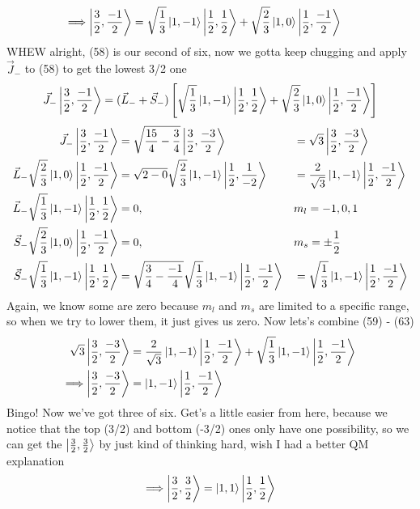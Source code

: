 \documentclass{article}
\begin{document}
\begin{enumerate}[label=\alph*)]
\begin{align}
		\Longrightarrow\ket{\frac{3}{2}, \frac{-1}{2}} &= \sqrt{\frac{1}{3}} \ket{1, -1}\ket{\frac{1}{2}, \frac{1}{2}} + \sqrt{\frac{2}{3}} \ket{1, 0}\ket{\frac{1}{2}, \frac{-1}{2}}
	\end{align}
	WHEW alright, (58) is our second of six, now we gotta keep chugging and apply $\vec{J}_-$ to (58) to get the lowest 3/2 one
	\[
	\vec{J}_{-}\ket{\frac{3}{2}, \frac{-1}{2}} = (\vec{L}_- +\vec{S}_-)\left[\sqrt{\frac{1}{3}} \ket{1, -1}\ket{\frac{1}{2}, \frac{1}{2}} + \sqrt{\frac{2}{3}} \ket{1, 0}\ket{\frac{1}{2}, \frac{-1}{2}}  \right] 
	\]
	\begin{alignat}{3}
		\vec{J}_-\ket{\frac{3}{2}, \frac{-1}{2}} &= \sqrt{ \frac{15}{4} - \frac{3}{4}} \ket{\frac{3}{2}, \frac{-3}{2}} &&= \sqrt{3} \ket{\frac{3}{2}, \frac{-3}{2}} \\
		\vec{L}_- \sqrt{\frac{2}{3}} \ket{1, 0}\ket{\frac{1}{2}, \frac{-1}{2}} &= \sqrt{2-0}\sqrt{\frac{2}{3}} \ket{1, -1}\ket{\frac{1}{2}, \frac{1}{-2}} &&= \frac{2}{\sqrt{3}} \ket{1, -1}\ket{\frac{1}{2}, \frac{-1}{2}} \\
		\vec{L}_- \sqrt{\frac{1}{3}} \ket{1, -1}\ket{\frac{1}{2}, \frac{1}{2}} &= 0, &&m_l = -1, 0, 1 \\
		\vec{S}_- \sqrt{\frac{2}{3}} \ket{1, 0}\ket{\frac{1}{2}, \frac{-1}{2}} &= 0, &&m_s = \pm \frac{1}{2} \\
		\vec{S}_- \sqrt{\frac{1}{3}} \ket{1, -1}\ket{\frac{1}{2}, \frac{1}{2}} &= \sqrt{\frac{3}{4} - \frac{-1}{4}}\sqrt{\frac{1}{3}} \ket{1, -1}\ket{\frac{1}{2}, \frac{-1}{2}} &&= \sqrt{\frac{1}{3}} \ket{1, -1}\ket{\frac{1}{2}, \frac{-1}{2}}
	\end{alignat}
	Again, we know some are zero because $m_l$ and $m_s$ are limited to a specific range, so when we try to lower them, it just gives us zero. Now lets's combine (59) - (63)
	\begin{align}
		\sqrt{3} \ket{\frac{3}{2}, \frac{-3}{2}} &= \frac{2}{\sqrt{3}} \ket{1, -1}\ket{\frac{1}{2}, \frac{-1}{2}} + \sqrt{\frac{1}{3}} \ket{1, -1}\ket{\frac{1}{2}, \frac{-1}{2}} \\
		\Longrightarrow \ket{\frac{3}{2}, \frac{-3}{2}} &= \ket{1, -1}\ket{\frac{1}{2}, \frac{-1}{2}} 
	\end{align}
	Bingo! Now we've got three of six. Get's a little easier from here, because we notice that the top (3/2) and bottom (-3/2) ones only have one possibility, so we can get the $\ket{\frac{3}{2}, \frac{3}{2}}$ by just kind of thinking hard, wish I had a better QM explanation
	\[
	\Longrightarrow \ket{\frac{3}{2}, \frac{3}{2}} = \ket{1, 1}\ket{\frac{1}{2}, \frac{1}{2}}
\]
\end{enumerate}
\end{document}
